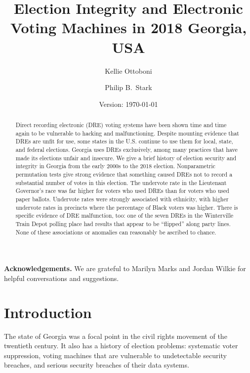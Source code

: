 \documentclass[runningheads]{llncs}
\title{Election Integrity and Electronic Voting Machines in 2018 Georgia, USA}
\author{
   Kellie Ottoboni\inst{1}\orcidID{0000-0002-9107-3402} \and
   Philip B.~Stark\inst{1}\orcidID{0000-0002-3771-9604}
}
\institute{
Department of Statistics, University of California, Berkeley, CA, USA
}
\date{Version: \today}
\begin{document}
\maketitle


\begin{abstract}
Direct recording electronic (DRE) voting systems have been shown time and time again to be vulnerable to hacking and malfunctioning.
Despite mounting evidence that DREs are unfit for use, some states in the U.S. continue to use them for local, state, and federal elections.
Georgia uses DREs exclusively, among many practices that have made its elections unfair and insecure.
We give a brief history of election security and integrity in Georgia from the early 2000s to the 2018
election.
Nonparametric permutation tests give strong evidence
that something caused DREs not to record a substantial number of votes in this election.
The undervote rate in the Lieutenant Governor's race was far higher for voters who used DREs than for voters who used paper ballots.
Undervote rates were strongly associated with ethnicity, with higher undervote rates
in precincts where the percentage of Black voters was higher.
There is specific evidence of DRE malfunction, too: one of the seven DREs in the Winterville
Train Depot polling place had results that appear to be ``flipped'' along party lines.
None of these associations or anomalies can reasonably be ascribed to chance.
\end{abstract}

\noindent
\textbf{Acknowledgements.}
We are grateful to Marilyn Marks and Jordan Wilkie for helpful conversations and suggestions.


\section{Introduction}

The state of Georgia was a focal point in the civil rights movement of the twentieth century.
It also has a history of election problems:
systematic voter suppression,
voting machines that are vulnerable to undetectable security breaches,
and serious security breaches of their data systems.
\end{document}
